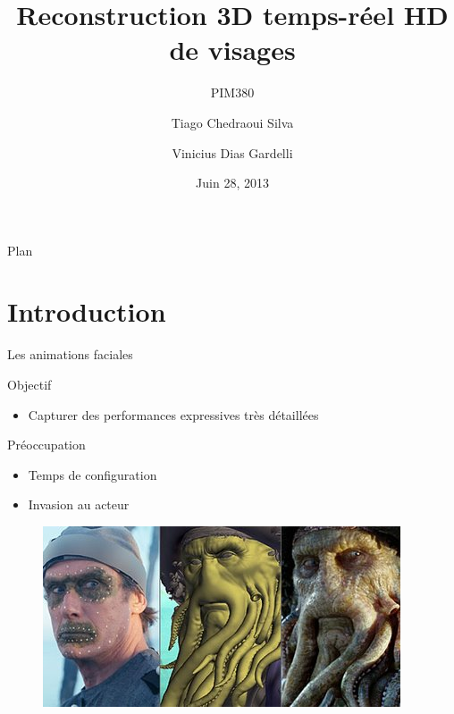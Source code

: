 \documentclass[compress,pdf,11pt,xcolor=dvipsnames]{beamer}
\title{Reconstruction 3D temps-réel HD de visages}
\subtitle{PIM380}
\author[Tiago Siva, Vinicius Gardelli]{
  Tiago Chedraoui Silva \and
  Vinicius Dias Gardelli\\
}
\institute{Télécom Paristech}
\date{Juin 28, 2013}
\begin{document}
\begin{frame}
  \titlepage
\end{frame}

\begin{frame}{Plan}
  \tableofcontents
\end{frame}

\section{Introduction}

\begin{frame}{Les animations faciales}

        \begin{block}{Objectif}
          \begin{itemize}
          \item Capturer des performances expressives très
          détaillées
          \end{itemize}
        \end{block}

        \begin{alertblock}{Préoccupation}
          \begin{itemize}
          \item Temps de configuration 
          \item Invasion au acteur 
          \end{itemize}
        \end{alertblock}

\begin{figure}
  
  \begin{columns}
    \begin{column}{0.5\textwidth}
      \includegraphics[width=\textwidth]{img/Face-Mocap}
    \end{column}
    \begin{column}{0.5\textwidth}
      

\end{column}
\end{columns}
\end{figure}
\end{frame}
\end{document}
